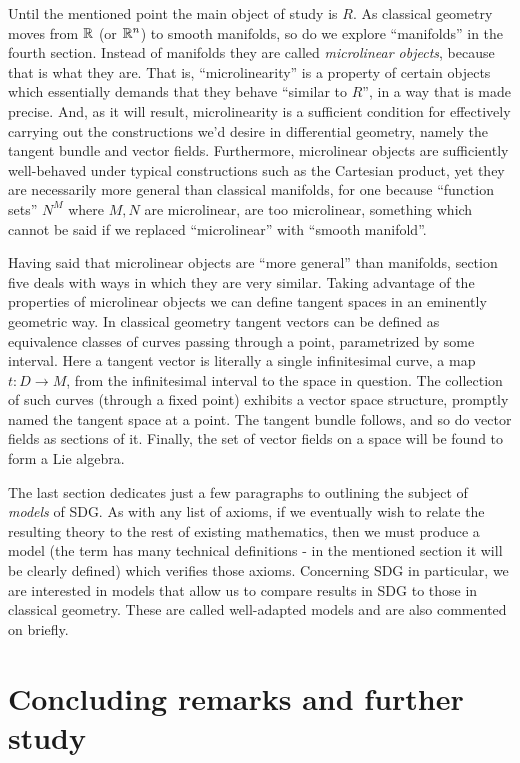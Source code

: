 Until the mentioned point the main object of study is \( R \). As classical geometry moves from \( \mathbb{R} \) (or \( \mathbb{R}^n \)) to smooth manifolds, so do we explore ``manifolds'' in the fourth section. Instead of manifolds they are called \emph{microlinear objects}, because that is what they are. That is, ``microlinearity'' is a property of certain objects which essentially demands that they behave ``similar to \( R \)'', in a way that is made precise. And, as it will result, microlinearity is a sufficient condition for effectively carrying out the constructions we'd desire in differential geometry, namely the tangent bundle and vector fields. Furthermore, microlinear objects are sufficiently well-behaved under typical constructions such as the Cartesian product, yet they are necessarily more general than classical manifolds, for one because ``function sets'' \( N^M \) where \( M,N \) are microlinear, are too microlinear, something which cannot be said if we replaced ``microlinear'' with ``smooth manifold''.

Having said that microlinear objects are ``more general'' than manifolds, section five deals with ways in which they are very similar. Taking advantage of the properties of microlinear objects we can define tangent spaces in an eminently geometric way. In classical geometry tangent vectors can be defined as equivalence classes of curves passing through a point, parametrized by some interval. Here a tangent vector is literally a single infinitesimal curve, a map \( t:D\to M \), from the infinitesimal interval to the space in question. The collection of such curves (through a fixed point) exhibits a vector space structure, promptly named the tangent space at a point. The tangent bundle follows, and so do vector fields as sections of it. Finally, the set of vector fields on a space will be found to form a Lie algebra.

The last section dedicates just a few paragraphs to outlining the subject of \emph{models} of SDG. As with any list of axioms, if we eventually wish to relate the resulting theory to the rest of existing mathematics, then we must produce a model (the term has many technical definitions - in the mentioned section it will be clearly defined) which verifies those axioms. Concerning SDG in particular, we are interested in models that allow us to compare results in SDG to those in classical geometry. These are called well-adapted models and are also commented on briefly.

\section{Concluding remarks and further study}

